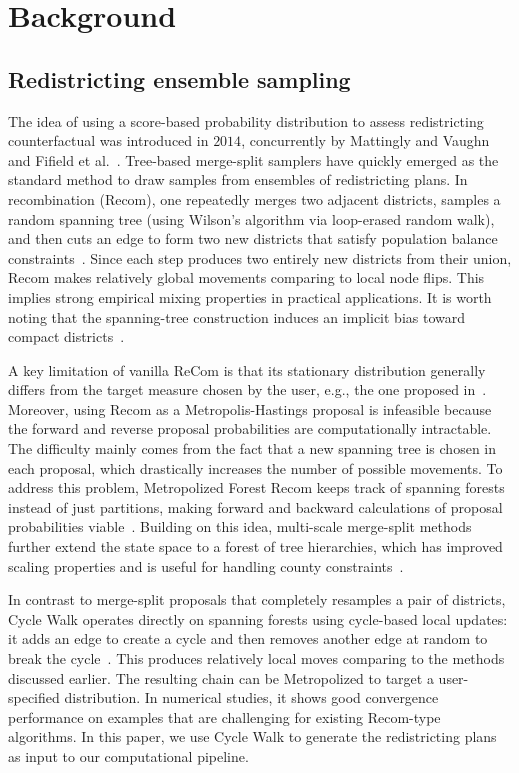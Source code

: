 \section{Background}\label{sec:chap4 background}

\subsection{Redistricting ensemble sampling}\label{subsec:districting_ensembles}

The idea of using a score-based probability distribution to assess redistricting counterfactual was introduced in $2014$, concurrently by Mattingly and Vaughn~\cite{mattingly2014redistricting} and Fifield et al.~\cite{fifield2015new}.
Tree-based merge-split samplers have quickly emerged as the standard method to draw samples from ensembles of redistricting plans.
In recombination (Recom), one repeatedly merges two adjacent districts, samples a random spanning tree (using Wilson's algorithm via loop-erased random walk), and then cuts an edge to form two new districts that satisfy population balance constraints~\cite{deford2021recombination}.
Since each step produces two entirely new districts from their union, Recom makes relatively global movements comparing to local node flips.
This implies strong empirical mixing properties in practical applications.
It is worth noting that the spanning-tree construction induces an implicit bias toward compact districts~\cite{deford2021recombination}.

A key limitation of vanilla ReCom is that its stationary distribution generally differs from the target measure chosen by the user, e.g., the one proposed in~\cite{mattingly2014redistricting}.
Moreover, using Recom as a Metropolis-Hastings proposal is infeasible because the forward and reverse proposal probabilities are computationally intractable.
The difficulty mainly comes from the fact that a new spanning tree is chosen in each proposal, which drastically increases the number of possible movements.
To address this problem, Metropolized Forest Recom keeps track of spanning forests instead of just partitions, making forward and backward calculations of proposal probabilities viable~\cite{autry2023metropolized}.
Building on this idea, multi-scale merge-split methods further extend the state space to a forest of tree hierarchies, which has improved scaling properties and is useful for handling county constraints~\cite{autry2020multi}.

In contrast to merge-split proposals that completely resamples a pair of districts, Cycle Walk operates directly on spanning forests using cycle-based local updates: it adds an edge to create a cycle and then removes another edge at random to break the cycle~\cite{cyclewalk}.
This produces relatively local moves comparing to the methods discussed earlier.
The resulting chain can be Metropolized to target a user-specified distribution.
In numerical studies, it shows good convergence performance on examples that are challenging for existing Recom-type algorithms.
In this paper, we use Cycle Walk to generate the redistricting plans as input to our computational pipeline.



